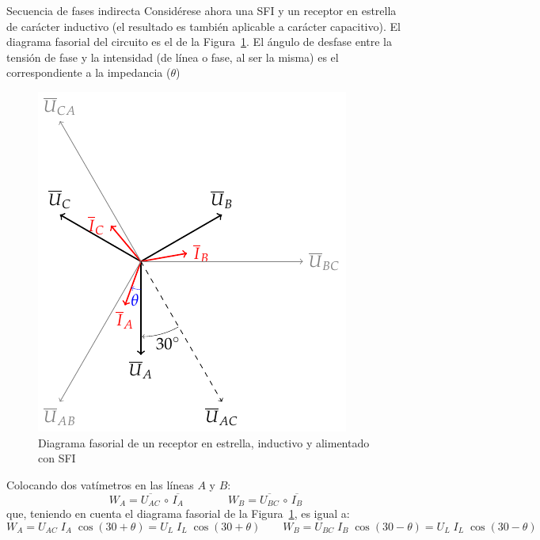 \documentclass[11pt]{book} %
\makeatletter
\numberwithin{dummy}{section}
\theoremstyle{ocrenumbox}
\theoremstyle{blacknumex}
\theoremstyle{blacknumbox}
\theoremstyle{ocrenum}
\renewcommand{\subsubsection}{\@startsection {subsubsection}{3}{\z@}
{-2ex \@plus -0.1ex \@minus -.2ex}
{.2ex \@plus.2ex }
{\normalfont\small\sffamily\bfseries}}
\newlength\esp
\makeatother
\begin{document}
  \subsubsection{Secuencia de fases indirecta}
	Considérese ahora una SFI y un receptor en estrella de carácter inductivo (el resultado es también aplicable a carácter capacitivo). El diagrama fasorial del circuito es el de la Figura~\ref{fig.fasores_potencia3H_SFI}. El ángulo de desfase entre la tensión de fase y la intensidad (de línea o fase, al ser la misma) es el correspondiente a la impedancia ($\theta$)
	\begin{figure}[htbp]
	    \centering
	    \includegraphics{../figs/fasores_potencia3H_SFI.pdf}
	    \caption{Diagrama fasorial de un receptor en estrella, inductivo y alimentado con SFI}
	    \label{fig.fasores_potencia3H_SFI}
	\end{figure}
	
	Colocando dos vatímetros en las líneas $A$ y $B$:
	\begin{equation*}
	    W_A=\overline{U_{AC}}\,\circ\,\overline{I_A}\qquad\qquad W_B=\overline{U_{BC}}\,\circ\,\overline{I_B}
	\end{equation*}
	que, teniendo en cuenta el diagrama fasorial de la Figura~\ref{fig.fasores_potencia3H_SFI}, es igual a: 
	\begin{equation*}
	    W_A={U_{AC}}\; {I_A}\;\cos{(30+\theta)}=U_L\;I_L\;\cos{(30+\theta)}\qquad W_B={U_{BC}}\; {I_B}\;\cos{(30-\theta)}=U_L\;I_L\;\cos{(30-\theta)}
	\end{equation*}
	
\end{document}
